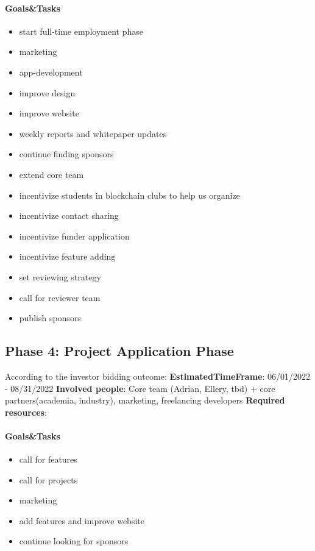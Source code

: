 \paragraph{Goals\&Tasks}
\begin{itemize}
    \item start full-time employment phase
    \item marketing 
    \item app-development
    \item improve design
    \item improve website
    \item weekly reports and whitepaper updates
    \item continue finding sponsors
    \item extend core team
    \item incentivize students in blockchain clubs to help us organize
    \item incentivize contact sharing
    \item incentivize funder application
    \item incentivize feature adding
    \item set reviewing strategy
    \item call for reviewer team
    \item publish sponsors
\end{itemize}

\subsection*{Phase 4: Project Application Phase}
According to the investor bidding outcome: 
\textbf{EstimatedTimeFrame}:
06/01/2022 - 08/31/2022
\textbf{Involved people}:
Core team (Adrian, Ellery, tbd) + core partners(academia, industry), marketing, freelancing developers
\textbf{Required resources}:


\paragraph{Goals\&Tasks}
\begin{itemize}
    \item call for features
    \item call for projects
    \item marketing 
    \item add features and improve website
    \item continue looking for sponsors
\end{itemize}

